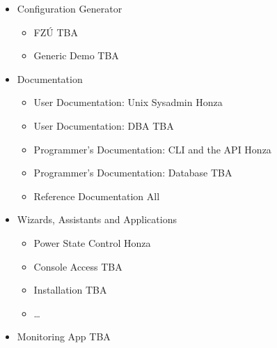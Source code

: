 \documentclass{article}
\begin{document}
\begin{itemize}
\begin{itemize}
        \end{itemize}
    \item Configuration Generator
        \begin{itemize}
            \item FZÚ \tab TBA
            \item Generic Demo \tab TBA
        \end{itemize}
    \item Documentation
        \begin{itemize}
            \item User Documentation: Unix Sysadmin \tab Honza
            \item User Documentation: DBA \tab TBA
            \item Programmer's Documentation: CLI and the API \tab Honza
            \item Programmer's Documentation: Database \tab TBA
            \item Reference Documentation \tab All
        \end{itemize}
    \item Wizards, Assistants and Applications
        \begin{itemize}
            \item Power State Control \tab Honza
            \item Console Access \tab TBA
            \item Installation \tab TBA
            \item \ldots
        \end{itemize}
    \item Monitoring App \tab TBA
\end{itemize}
\end{document}
